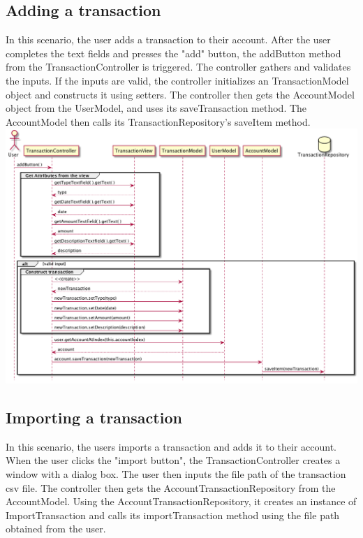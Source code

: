 \documentclass[12pt]{article}
\begin{document}
\subsection{Adding a transaction}
In this scenario, the user adds a transaction to their account. After the user completes the text fields and presses the "add" button, the addButton method from the TransactionController is triggered. The controller gathers and validates the inputs. If the inputs are valid, the controller initializes an TransactionModel object and constructs it using setters. The controller then gets the AccountModel object from the UserModel, and uses its saveTransaction method. The AccountModel then calls its TransactionRepository's saveItem method.
\includegraphics[width=\textwidth,height=\textheight,keepaspectratio]{diagrams/sequence/addTransaction.png}

\subsection{Importing a transaction}
In this scenario, the users imports a transaction and adds it to their account. When the user clicks the "import button", the TransactionController creates a window with a dialog box. The user then inputs the file path of the transaction csv file. The controller then gets the AccountTransactionRepository from the AccountModel. Using the AccountTransactionRepository, it creates an instance of ImportTransaction and calls its importTransaction method using the file path obtained from the user.
\end{document}
